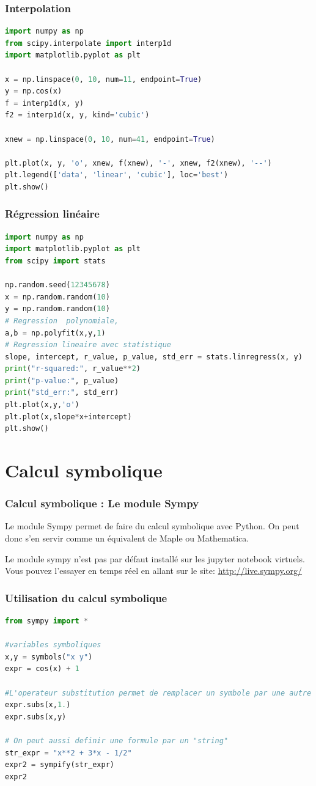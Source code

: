 \documentclass[]{beamer}
\begin{document}
\begin{frame}[fragile]
\frametitle{Interpolation}
\begin{lstlisting}[language=Python]
import numpy as np
from scipy.interpolate import interp1d
import matplotlib.pyplot as plt

x = np.linspace(0, 10, num=11, endpoint=True)
y = np.cos(x)
f = interp1d(x, y)
f2 = interp1d(x, y, kind='cubic')
 
xnew = np.linspace(0, 10, num=41, endpoint=True)

plt.plot(x, y, 'o', xnew, f(xnew), '-', xnew, f2(xnew), '--')
plt.legend(['data', 'linear', 'cubic'], loc='best')
plt.show()


\end{lstlisting}
\end{frame}

\begin{frame}[fragile]
\frametitle{Régression linéaire}
\begin{lstlisting}[language=Python]
import numpy as np
import matplotlib.pyplot as plt
from scipy import stats

np.random.seed(12345678)
x = np.random.random(10)
y = np.random.random(10)
# Regression  polynomiale,
a,b = np.polyfit(x,y,1)
# Regression lineaire avec statistique
slope, intercept, r_value, p_value, std_err = stats.linregress(x, y)
print("r-squared:", r_value**2)
print("p-value:", p_value)
print("std_err:", std_err)
plt.plot(x,y,'o')
plt.plot(x,slope*x+intercept)
plt.show()

\end{lstlisting}
\end{frame}


\section{Calcul symbolique}

\begin{frame}
\frametitle{Calcul symbolique : Le module Sympy}
Le module Sympy permet de faire du calcul symbolique avec Python. On peut donc s'en servir comme un équivalent de Maple ou Mathematica.

Le module sympy n'est pas par défaut installé sur les jupyter notebook virtuels. Vous pouvez l'essayer en temps réel en allant sur le site: \url{http://live.sympy.org/}
\end{frame}

\begin{frame}[fragile]
\frametitle{Utilisation du calcul symbolique}
\begin{lstlisting}[language=Python]
from sympy import *

#variables symboliques
x,y = symbols("x y")
expr = cos(x) + 1

#L'operateur substitution permet de remplacer un symbole par une autre ou par une value numerique
expr.subs(x,1.)
expr.subs(x,y)

# On peut aussi definir une formule par un "string"
str_expr = "x**2 + 3*x - 1/2"
expr2 = sympify(str_expr)
expr2
\end{lstlisting}
\end{frame}
\end{document}
